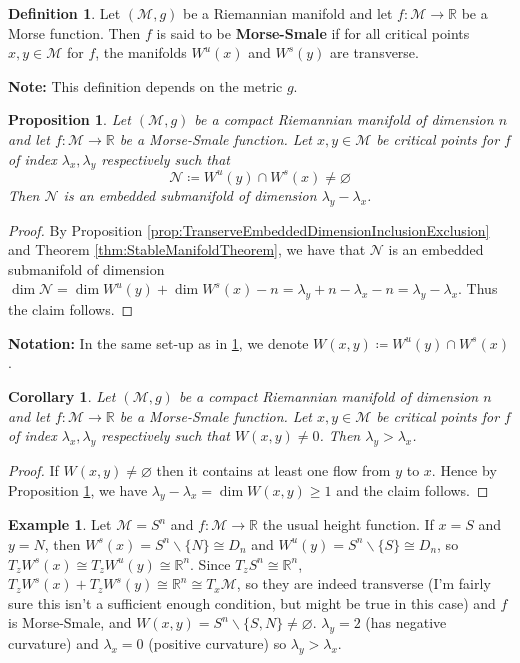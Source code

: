 \documentclass[10pt]{article}
\theoremstyle{plain}
\newtheorem{corollary}[thm]{Corollary}
\newtheorem{prop}[thm]{Proposition}
\theoremstyle{definition}
\newtheorem{defn}[thm]{Definition} %
\newtheorem{exmp}[thm]{Example} %
\newcommand{\Notation}{\textbf{Notation: }}
\newcommand{\Note}{\textbf{Note: }}
\newcommand{\Real}{\mathbb{R}}
\newcommand{\man}{\mathcal{M}}
\newcommand{\nan}{\mathcal{N}}
\begin{document}
\begin{defn}
    Let $(\man,g)$ be a Riemannian manifold and let $f:\man\to\Real$ be a Morse function. Then $f$ is said to be \textbf{Morse-Smale} if for all critical points $x,y\in\man$ for $f$, the manifolds $W^u(x)$ and $W^s(y)$ are transverse.
\end{defn}
\Note This definition depends on the metric $g$.
\begin{prop}\label{prop:IntersectionOfStableUnstableManifoldsDimension}
    Let $(\man,g)$ be a compact Riemannian manifold of dimension $n$ and let $f:\man \to\Real$ be a Morse-Smale function. Let $x,y\in\man$ be critical points for $f$ of index $\lambda_x,\lambda_y$ respectively such that 
        $$\nan \coloneqq W^u(y)\cap W^s(x) \neq \varnothing$$
    Then $\nan$ is an embedded submanifold of dimension $\lambda_y - \lambda_x$.
\end{prop}
\begin{proof}
    By Proposition \ref{prop:TranserveEmbeddedDimensionInclusionExclusion} and Theorem \ref{thm:StableManifoldTheorem}, we have that $\nan$ is an embedded submanifold of dimension $\dim \nan = \dim W^u(y) + \dim W^s(x) - n = \lambda_y + n -\lambda_x - n = \lambda_y - \lambda_x.$ Thus the claim follows.
\end{proof}
\noindent
\Notation In the same set-up as in \ref{prop:IntersectionOfStableUnstableManifoldsDimension}, we denote $W(x,y) \coloneqq W^u(y)\cap W^s(x)$.

\begin{corollary}
    Let $(\man,g)$ be a compact Riemannian manifold of dimension $n$ and let $f:\man\to\Real$ be a Morse-Smale function. Let $x,y\in\man$ be critical points for $f$ of index $\lambda_x,\lambda_y$ respectively such that $W(x,y) \neq 0$. Then $\lambda_y > \lambda_x$.
\end{corollary}
\begin{proof}
    If $W(x,y) \neq \varnothing$ then it contains at least one flow from $y$ to $x$. Hence by Proposition \ref{prop:IntersectionOfStableUnstableManifoldsDimension}, we have $\lambda_y - \lambda_x = \dim W(x,y) \geq 1$ and the claim follows.
\end{proof}
\begin{exmp}
    Let $\man = S^n$ and $f:\man\to\Real$ the usual height function. If $x=S$ and $y = N$, then $W^s(x) = S^n \backslash\{N\} \cong D_n$ and $W^u(y) = S^n \backslash\{S\} \cong D_n$, so $T_zW^s(x) \cong T_zW^u(y) \cong \Real^n$. Since $T_zS^n \cong \Real^n$, $T_zW^s(x) + T_zW^s(y) \cong \Real^n \cong T_x\man$, so they are indeed transverse (I'm fairly sure this isn't a sufficient enough condition, but might be true in this case) and $f$ is Morse-Smale, and $W(x,y) = S^n \backslash\{S,N\} \neq \varnothing$. $\lambda_y = 2$ (has negative curvature) and $\lambda_x = 0 $ (positive curvature) so $\lambda_y > \lambda _x$. 
\end{exmp}
\end{document}
